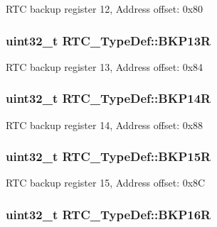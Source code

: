 R\-T\-C backup register 12, Address offset\-: 0x80 \hypertarget{struct_r_t_c___type_def_a138903d4681455a660dccbaf3409263d}{
\subsubsection[{B\-K\-P13\-R}]{ uint32\-\_\-t R\-T\-C\-\_\-\-Type\-Def\-::\-B\-K\-P13\-R}}\label{struct_r_t_c___type_def_a138903d4681455a660dccbaf3409263d}
R\-T\-C backup register 13, Address offset\-: 0x84 \hypertarget{struct_r_t_c___type_def_adaae50f5c3213014fb9818eaee389676}{
\subsubsection[{B\-K\-P14\-R}]{ uint32\-\_\-t R\-T\-C\-\_\-\-Type\-Def\-::\-B\-K\-P14\-R}}\label{struct_r_t_c___type_def_adaae50f5c3213014fb9818eaee389676}
R\-T\-C backup register 14, Address offset\-: 0x88 \hypertarget{struct_r_t_c___type_def_a797f43f9cc1858baebd1799be288dff6}{
\subsubsection[{B\-K\-P15\-R}]{ uint32\-\_\-t R\-T\-C\-\_\-\-Type\-Def\-::\-B\-K\-P15\-R}}\label{struct_r_t_c___type_def_a797f43f9cc1858baebd1799be288dff6}
R\-T\-C backup register 15, Address offset\-: 0x8\-C \hypertarget{struct_r_t_c___type_def_a181ad73082bde7d74010aac16bd373fc}{
\subsubsection[{B\-K\-P16\-R}]{ uint32\-\_\-t R\-T\-C\-\_\-\-Type\-Def\-::\-B\-K\-P16\-R}}\label{struct_r_t_c___type_def_a181ad73082bde7d74010aac16bd373fc}
